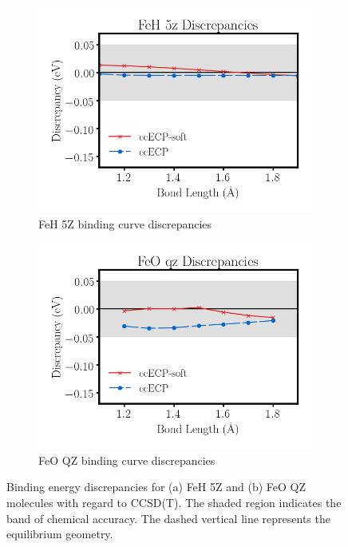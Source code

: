 \begin{figure}[!htbp]
\centering
\begin{subfigure}{0.5\textwidth}
\includegraphics[width=\textwidth]{figures/FeH_5z.png}
\caption{FeH 5Z binding curve discrepancies}
\label{fig:FeO_5z}
\end{subfigure}%
\begin{subfigure}{0.5\textwidth}
\includegraphics[width=\textwidth]{figures/FeO_qz.png}
\caption{FeO QZ binding curve discrepancies}
\label{fig:FeO_qz}
\end{subfigure}
\caption{Binding energy discrepancies for (a) FeH 5Z and (b) FeO QZ molecules with regard to CCSD(T). The shaded region indicates the band of chemical accuracy. The dashed vertical line represents the equilibrium geometry.}
\label{fig:Fe_mols}
\end{figure}





